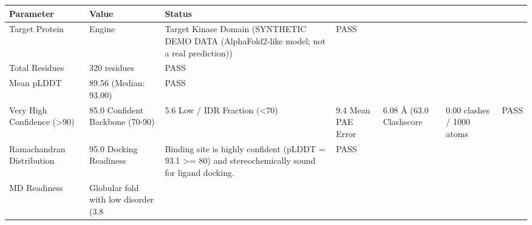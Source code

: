 \begin{tabular}{lll}
\toprule
Parameter & Value & Status \\
\midrule
Target Protein & Engine & Target Kinase Domain (SYNTHETIC DEMO DATA (AlphaFold2-like model; not a real prediction)) & PASS \\
Total Residues & 320 residues & PASS \\
Mean pLDDT & 89.56 (Median: 93.00) & PASS \\
Very High Confidence (>90) & 85.0%
Confident Backbone (70-90) & 5.6%
Low / IDR Fraction (<70) & 9.4%
Mean PAE Error & 6.08 Å (63.0%
Clashscore & 0.00 clashes / 1000 atoms & PASS \\
Ramachandran Distribution & 95.0%
Docking Readiness & Binding site is highly confident (pLDDT = 93.1 >= 80) and stereochemically sound for ligand docking. & PASS \\
MD Readiness & Globular fold with low disorder (3.8%
\bottomrule
\end{tabular}
